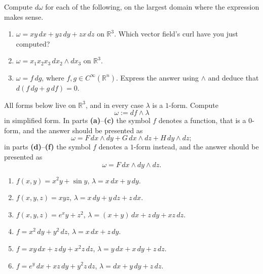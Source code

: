 \begin{aiexercise}
\label{ex:ai_exterior_derivative_drill}
Compute $d\omega$ for each of the following, on the largest domain where the expression makes
sense.
\begin{enumerate}[label=\textbf{(\alph*)}]
  \item $\omega = xy\,dx + yz\,dy + zx\,dz$ on $\mathbb{R}^3$. Which vector field's curl have you
    just computed?
  \item $\omega = x_1x_2x_3\,dx_2\wedge dx_3$ on $\mathbb{R}^3$.
  \item $\omega = f\,dg$, where $f,g \in C^\infty(\mathbb{R}^n)$. Express the answer using
    $\wedge$ and deduce that $d(f\,dg + g\,df) = 0$.
\end{enumerate}
\end{aiexercise}

\begin{exercise}
\label{ex:serra_df_wedge_lambda}
All forms below live on $\mathbb{R}^3$, and in every case $\lambda$ is a $1$-form. Compute
\[\omega := df \wedge \lambda\]
in simplified form. In parts \textbf{(a)}--\textbf{(c)} the symbol $f$ denotes a function, that is
a $0$-form, and the answer should be presented as
\[\omega = F\,dx\wedge dy + G\,dx\wedge dz + H\,dy\wedge dz;\]
in parts \textbf{(d)}--\textbf{(f)} the symbol $f$ denotes a $1$-form instead, and the answer
should be presented as
\[\omega = F\,dx\wedge dy\wedge dz.\]
\begin{enumerate}[label=\textbf{(\alph*)}]
  \item $f(x,y) = x^2y + \sin y$, \qquad $\lambda = x\,dx + y\,dy$.
  \item $f(x,y,z) = xyz$, \qquad $\lambda = x\,dy + y\,dz + z\,dx$.
  \item $f(x,y,z) = e^xy + z^2$, \qquad $\lambda = (x+y)\,dx + z\,dy + xz\,dz$.
  \item $f = x^2\,dy + y^2\,dz$, \qquad $\lambda = x\,dx + z\,dy$.
  \item $f = xy\,dx + z\,dy + x^2z\,dz$, \qquad $\lambda = y\,dx + x\,dy + z\,dz$.
  \item $f = e^y\,dx + xz\,dy + y^2z\,dz$, \qquad $\lambda = dx + y\,dy + z\,dz$.
\end{enumerate}
\end{exercise}

